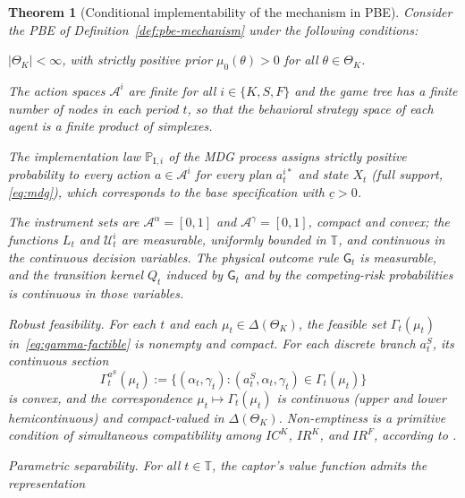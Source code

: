 \documentclass[review,authoryear,12pt]{elsarticle}
\providecommand{\textcite}{\citet}
\theoremstyle{plain}
\newtheorem{theorem}{Theorem}
\theoremstyle{definition}
\newcommand{\ThetaK}{\Theta_K}
\newcommand{\1}{\mathbf{1}}
\newcommand{\ProbI}[1]{\mathbb{P}_{\mathrm{I},#1}}
\begin{document}
\begin{theorem}[Conditional implementability of the mechanism in PBE]\label{thm:ebp-implementabilidad}
\normalfont
Consider the PBE of Definition~\ref{def:pbe-mechanism} under the following conditions:
\begin{list}{}{\setlength{\labelwidth}{2.6em}\setlength{\labelsep}{0.7em}\setlength{\leftmargin}{3.3em}\setlength{\itemindent}{0pt}\setlength{\listparindent}{0pt}\setlength{\parsep}{0pt}\setlength{\itemsep}{0.35\baselineskip}}
  \item[\textup{(i)}] $|\ThetaK|<\infty$, with strictly positive prior $\mu_0(\theta)>0$ for all $\theta\in\ThetaK$.
  \item[\textup{(ii)}] The action spaces $\mathcal{A}^i$ are finite for all $i\in\{K,S,F\}$ and the game tree has a finite number of nodes in each period $t$, so that the behavioral strategy space of each agent is a finite product of simplexes.
  \item[\textup{(iii)}] The implementation law $\ProbI{i}$ of the MDG process assigns strictly positive probability to every action $a\in\mathcal{A}^i$ for every plan $a_t^{i\ast}$ and state $X_t$ \textup{(}full support, \eqref{eq:mdg}\textup{)}, which corresponds to the base specification with $\underline{c}>0$.
  \item[\textup{(iv)}] The instrument sets are $\mathcal{A}^{\alpha}=[0,1]$ and $\mathcal{A}^{\gamma}=[0,1]$, compact and convex; the functions $L_t$ and $\mathcal{U}_t^i$ are measurable, uniformly bounded in $\mathbb{T}$, and continuous in the continuous decision variables. The physical outcome rule $\mathsf{G}_t$ is measurable, and the transition kernel $Q_t$ induced by $\mathsf{G}_t$ and by the competing-risk probabilities is continuous in those variables.
  \item[\textup{(v)}] Robust feasibility. For each $t$ and each $\mu_t\in\Delta(\ThetaK)$, the feasible set $\Gamma_t(\mu_t)$ in~\eqref{eq:gamma-factible} is nonempty and compact. For each discrete branch $a_t^S$, its continuous section
  \[
  \Gamma_t^{a^S}(\mu_t):=\{(\alpha_t,\gamma_t):(a_t^S,\alpha_t,\gamma_t)\in\Gamma_t(\mu_t)\}
  \]
  is convex, and the correspondence $\mu_t\mapsto\Gamma_t(\mu_t)$ is continuous \textup{(}upper and lower hemicontinuous\textup{)} and compact-valued in $\Delta(\ThetaK)$. Non-emptiness is a primitive condition of simultaneous compatibility among $IC^K$, $IR^K$, and $IR^F$, according to \textcite{KadanRenySwinkels2017}.
  \item[\textup{(vi)}] Parametric separability. For all $t\in\mathbb{T}$, the captor's value function admits the representation

\end{list}
\end{theorem}
\end{document}
